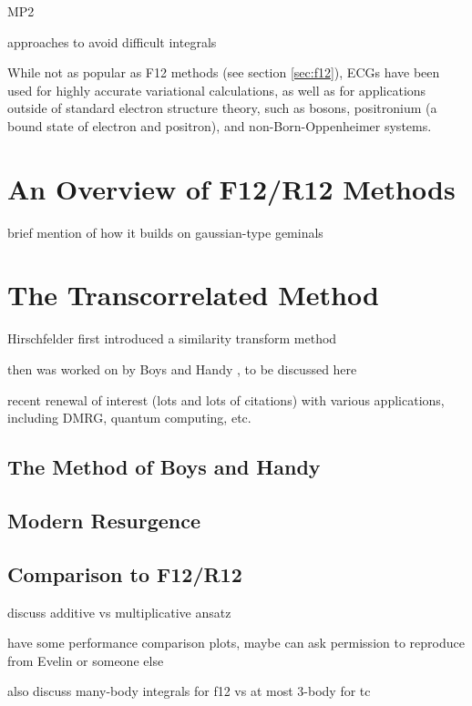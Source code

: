 MP2\cite{panGaussian1970,panElectron1972}


approaches to avoid difficult integrals\cite{szalewiczNew1982,szalewiczAtomic1983,wenzelAtomic1986,szalewiczAtomic1984,tewWeak2007}

\todo{}

While not as popular as F12 methods (see section \autoref{sec:f12}), \glspl{ECG} have been used for highly accurate variational calculations\cite{korobovCoulomb2000}, as well as for applications outside of standard electron structure theory, such as bosons\cite{vargaPrecise1995}, positronium (a bound state of electron and positron)\cite{bubinGroundstate2011}, and non-Born-Oppenheimer systems\cite{stankeNonBornOppenheimer2009}.

\section{An Overview of F12/R12 Methods}
\label{sec:f12}

brief mention of how it builds on gaussian-type geminals


\section{The Transcorrelated Method}
\label{sec:tc}

Hirschfelder first introduced a similarity transform method \cite{hirschfelderRemoval1963}

then was worked on by Boys and Handy , to be discussed here

recent renewal of interest (lots and lots of citations) with various applications, including DMRG, quantum computing, etc.


\subsection{The Method of Boys and Handy}

\subsection{Modern Resurgence}


\subsection{Comparison to F12/R12}

discuss additive vs multiplicative ansatz

have some performance comparison plots, maybe can ask permission to reproduce from Evelin or someone else

also discuss many-body integrals for f12 vs at most 3-body for tc


